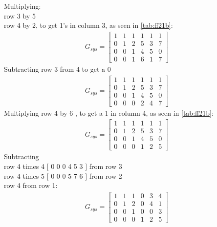Multiplying: \\row 3 by 5 \\row 4 by 2, to get 1's in column 3, as seen in \ref{tab:ff21b}: \\
\begin{align}
    G_{sys} = 
    \begin{bmatrix}
        1 & 1 & 1 & 1 & 1 & 1 \\
        0 & 1 & 2 & 5 & 3 & 7 \\
        0 & 0 & 1 & 4 & 5 & 0 \\
        0 & 0 & 1 & 6 & 1 & 7 
    \end{bmatrix}
\end{align}
Subtracting row 3 from 4 to get a 0 \\
\begin{align}
    G_{sys} = 
    \begin{bmatrix}
        1 & 1 & 1 & 1 & 1 & 1 \\
        0 & 1 & 2 & 5 & 3 & 7 \\
        0 & 0 & 1 & 4 & 5 & 0 \\
        0 & 0 & 0 & 2 & 4 & 7 
    \end{bmatrix}
\end{align}
Multiplying row 4 by 6 , to get a 1 in column 4, as seen in \ref{tab:ff21b}: \\
\begin{align}
    G_{sys} = 
    \begin{bmatrix}
        1 & 1 & 1 & 1 & 1 & 1 \\
        0 & 1 & 2 & 5 & 3 & 7 \\
        0 & 0 & 1 & 4 & 5 & 0 \\
        0 & 0 & 0 & 1 & 2 & 5 
    \end{bmatrix}
\end{align} 
Subtracting \\ row 4 times 4 $[$ 0 0 0 4 5 3 $]$ from row 3 \\row 4 times 5 $[$ 0 0 0 5 7 6 $]$ from row 2 \\ row 4 from row 1:\\
\begin{align}
    G_{sys} = 
    \begin{bmatrix}
        1 & 1 & 1 & 0 & 3 & 4 \\
        0 & 1 & 2 & 0 & 4 & 1 \\
        0 & 0 & 1 & 0 & 0 & 3 \\
        0 & 0 & 0 & 1 & 2 & 5 
    \end{bmatrix}
\end{align} 
